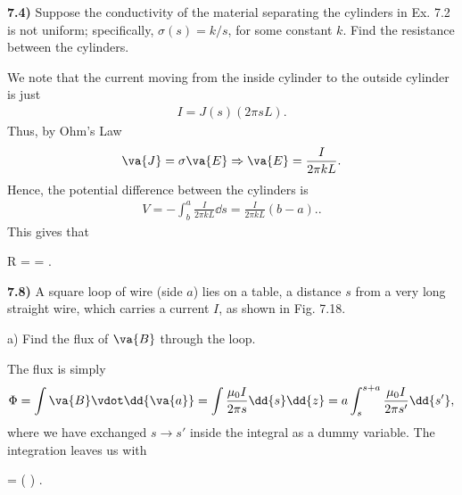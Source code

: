 \documentclass[12pt,a4paper]{article}
\newcommand{\prob}[2]{\textbf{#1)} #2}
\begin{document}
\prob{7.4}{
Suppose the conductivity of the material separating the cylinders in Ex. 7.2 is not uniform; specifically, $\sigma(s) = k/s$, for some constant $k$.
Find the resistance between the cylinders.
}

\begin{figure}[H]
   \begin{center}
       \def\svgwidth{0.5\linewidth} 
       
   \end{center} 
\end{figure}

We note that the current moving from the inside cylinder to the outside cylinder is just 
\begin{align*}
    I = J(s)\left( 2 \pi s L \right)
.\end{align*}
Thus, by Ohm's Law
\begin{align*}
    \va{J} = \sigma \va{E} \Rightarrow \va{E} = \frac{I}{2 \pi k L}
.\end{align*}
Hence, the potential difference between the cylinders is 
\begin{align*}
   V = - \int_{b}^{a} \frac{I}{2 \pi k L} \dd{s} = \frac{I}{2 \pi k L}\left( b - a \right). 
.\end{align*}
This gives that 
\begin{eqbox}
    R =  = 
.\end{eqbox}

\newpage

\prob{7.8}{
A square loop of wire (side $a$) lies on a table, a distance $s$ from a very long straight wire, which carries a current $I$, as shown in Fig. 7.18.
}

\begin{figure}[H]
   \begin{center}
       \def\svgwidth{\linewidth} 
       
   \end{center} 
\end{figure}

a) Find the flux of $\va{B}$ through the loop.

The flux is simply
\begin{align*}
    \Phi = \int \va{B} \vdot \dd{\va{a}} = \int \frac{\mu_0 I}{2 \pi s} \dd{s} \dd{z} = a \int_{s}^{s+a} \frac{\mu_0 I}{2 \pi s'} \dd{s'}
,\end{align*}
where we have exchanged $s \rightarrow s'$ inside the integral as a dummy variable.
The integration leaves us with
\begin{eqbox}
    \Phi =  \ln\left(  \right)
.\end{eqbox}
\end{document}
